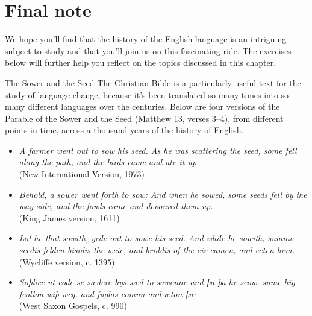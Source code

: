 \section{Final note}
We hope you'll find that the history of the English language is an intriguing subject to study and that you'll join us on this fascinating ride. The exercises below will further help you reflect on the topics discussed in this chapter.


\begin{exercises}{The Sower and the Seed}\label{sower-and-seed}
The Christian Bible is a particularly useful text for the study of language change, because it's been translated so many times into so many different languages over the centuries. Below are four versions of the Parable of the Sower and the Seed (Matthew 13, verses 3--4), from different points in time, across a thousand years of the history of English.

\begin{itemize}
    \item \textit{A farmer went out to sow his seed. As he was scattering the seed, some fell along the path, and the birds came and ate it up.}\\ 
	(New International Version, 1973)
    \item \textit{Behold, a sower went forth to sow; And when he sowed, some seeds fell by the way side, and the fowls came and devoured them up.}\\ 
	(King James version, 1611)
    \item \textit{Lo! he that sowith, yede out to sowe his seed. And while he sowith, summe seedis felden bisidis the weie, and briddis of the eir camen, and eeten hem.}\\
	(Wycliffe version, c. 1395)
    \item \textit{Soþlice ut eode se sædere hys sæd to sawenne and þa þa he seow. sume hig feollon wiþ weg. and fuglas comun and æton þa;}\\
    (West Saxon Gospels, c. 990)
\end{itemize}


\end{exercises}
